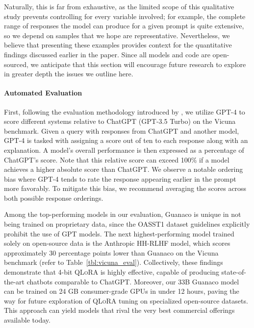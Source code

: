 Naturally, this is far from exhaustive, as the limited scope of this qualitative study prevents controlling for every variable involved; for example, the complete range of responses the model can produce for a given prompt is quite extensive, so we depend on samples that we hope are representative. Nevertheless, we believe that presenting these examples provides context for the quantitative findings discussed earlier in the paper. Since all models and code are open-sourced, we anticipate that this section will encourage future research to explore in greater depth the issues we outline here.

\paragraph{Automated Evaluation} First, following the evaluation methodology introduced by \citet{vicuna2023}, we utilize GPT-4 to score different systems relative to ChatGPT (GPT-3.5 Turbo) on the Vicuna benchmark. Given a query with responses from ChatGPT and another model, GPT-4 is tasked with assigning a score out of ten to each response along with an explanation. A model’s overall performance is then expressed as a percentage of ChatGPT’s score. Note that this relative score can exceed 100\% if a model achieves a higher absolute score than ChatGPT. We observe a notable ordering bias where GPT-4 tends to rate the response appearing earlier in the prompt more favorably. To mitigate this bias, we recommend averaging the scores across both possible response orderings.

Among the top-performing models in our evaluation, {Guanaco} is unique in not being trained on proprietary data, since the OASST1 dataset guidelines explicitly prohibit the use of GPT models. The next highest-performing model trained solely on open-source data is the Anthropic HH-RLHF model, which scores approximately 30 percentage points lower than {Guanaco} on the Vicuna benchmark (refer to Table~\ref{tbl:vicuna_eval}). Collectively, these findings demonstrate that 4-bit \textsc{QLoRA} is highly effective, capable of producing state-of-the-art chatbots comparable to ChatGPT. Moreover, our 33B {Guanaco} model can be trained on 24 GB consumer-grade GPUs in under 12 hours, paving the way for future exploration of \textsc{QLoRA} tuning on specialized open-source datasets. This approach can yield models that rival the very best commercial offerings available today.

